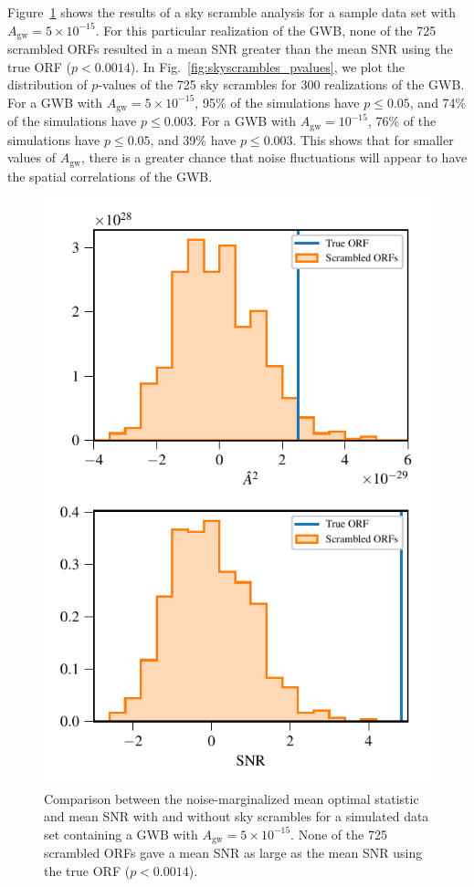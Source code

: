 \documentclass[twocolumn,aps,prd,superscriptaddress]{revtex4-1}
\newcommand{\Agw}{\ensuremath{A_\mathrm{gw}}}
\begin{document}
Figure~\ref{fig:skyscrambles_dataset_sample} shows the results of a sky scramble analysis 
for a sample data set with $\Agw=5\times10^{-15}$. 
For this particular realization of the GWB, 
none of the 725 scrambled ORFs resulted in a mean SNR greater than 
the mean SNR using the true ORF ($p < 0.0014$).
In Fig.~\ref{fig:skyscrambles_pvalues}, we plot the distribution of $p$-values of the 725 sky scrambles 
for 300 realizations of the GWB. 
For a GWB with $\Agw = 5\times10^{-15}$, 95\% of the simulations have $p \leq 0.05$, 
and 74\% of the simulations have $p \leq 0.003$. 
For a GWB with $\Agw = 10^{-15}$, 76\% of the simulations have $p \leq 0.05$, 
and 39\% have $p \leq 0.003$. 
This shows that for smaller values of \Agw, 
there is a greater chance that noise fluctuations will appear 
to have the spatial correlations of the GWB.
\begin{figure}[t]
	\includegraphics[width=0.9\columnwidth]{plots/optstat_scrambled_dataset11.pdf}
	\caption{Comparison between the noise-marginalized mean optimal statistic and mean SNR 
			with and without sky scrambles for a simulated data set 
			containing a GWB with $\Agw = 5\times10^{-15}$. 
			None of the 725 scrambled ORFs gave a mean SNR as large 
			as the mean SNR using the true ORF ($p < 0.0014$).}
	\label{fig:skyscrambles_dataset_sample}
\end{figure}
\end{document}
